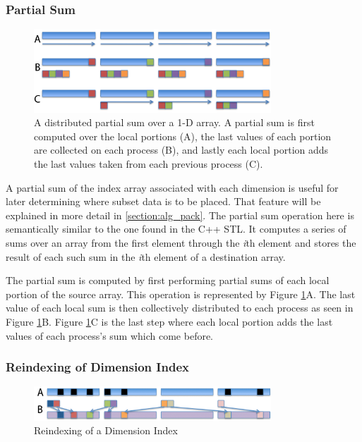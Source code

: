 \subsubsection{Partial Sum}

\begin{figure}[!t]
\center
\includegraphics[width=3.5in]{images/partialsum_label}
\caption{A distributed partial sum over a 1-D array.  A partial sum is first
computed over the local portions (A), the last values of each portion are
collected on each process (B), and lastly each local portion adds the last
values taken from each previous process (C).}
\label{fig:partialsum}
\end{figure}

A partial sum of the index array associated with each dimension is useful for
later determining where subset data is to be placed.  That feature will be
explained in more detail in \ref{section:alg_pack}.  The partial sum operation
here is semantically similar to the one found in the C++ STL\cite{CXXSTL}.  It
computes a series of sums over an array from the first element through the
\emph{i}th element and stores the result of each such sum in the \emph{i}th
element of a destination array.

The partial sum is computed by first performing partial sums of each local
portion of the source array.  This operation is represented by Figure
\ref{fig:partialsum}A.  The last value of each local sum is then collectively
distributed to each process as seen in Figure \ref{fig:partialsum}B.  Figure
\ref{fig:partialsum}C is the last step where each local portion adds the last
values of each process's sum which come before.

\subsubsection{Reindexing of Dimension Index}

\begin{figure}[!t]
\center
\includegraphics[width=3.5in]{images/unpack_label}
\caption{Reindexing of a Dimension Index}
\label{fig:unpack}
\end{figure}

